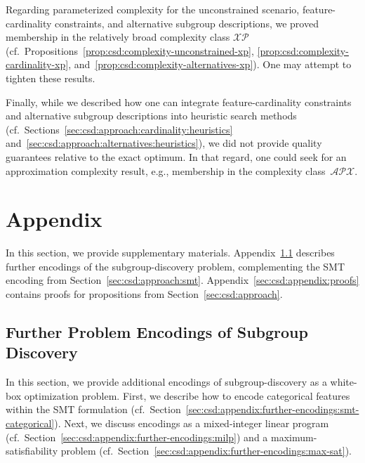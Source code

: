 \documentclass{article}
\theoremstyle{definition}
\begin{document}
Regarding parameterized complexity for the unconstrained scenario, feature-cardinality constraints, and alternative subgroup descriptions, we proved membership in the relatively broad complexity class $\mathcal{XP}$ (cf.~Propositions~\ref{prop:csd:complexity-unconstrained-xp}, \ref{prop:csd:complexity-cardinality-xp}, and~\ref{prop:csd:complexity-alternatives-xp}).
One may attempt to tighten these results.

Finally, while we described how one can integrate feature-cardinality constraints and alternative subgroup descriptions into heuristic search methods (cf.~Sections~\ref{sec:csd:approach:cardinality:heuristics} and~\ref{sec:csd:approach:alternatives:heuristics}), we did not provide quality guarantees relative to the exact optimum.
In that regard, one could seek for an approximation complexity result, e.g., membership in the complexity class~$\mathcal{APX}$.


\appendix

\section{Appendix}
\label{sec:csd:appendix}

In this section, we provide supplementary materials.
Appendix~\ref{sec:csd:appendix:further-encodings} describes further encodings of the subgroup-discovery problem, complementing the SMT encoding from Section~\ref{sec:csd:approach:smt}.
Appendix~\ref{sec:csd:appendix:proofs} contains proofs for propositions from Section~\ref{sec:csd:approach}.

\subsection{Further Problem Encodings of Subgroup Discovery}
\label{sec:csd:appendix:further-encodings}

In this section, we provide additional encodings of subgroup-discovery as a white-box optimization problem.
First, we describe how to encode categorical features within the SMT formulation (cf.~Section~\ref{sec:csd:appendix:further-encodings:smt-categorical}).
Next, we discuss encodings as a mixed-integer linear program (cf.~Section~\ref{sec:csd:appendix:further-encodings:milp}) and a maximum-satisfiability problem (cf.~Section~\ref{sec:csd:appendix:further-encodings:max-sat}).
\end{document}
